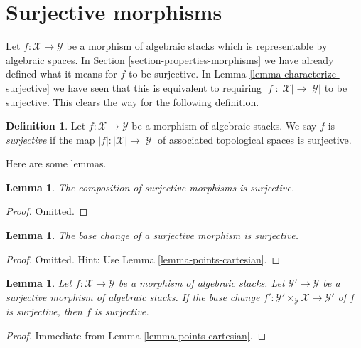 \documentclass{stacks-project}
\theoremstyle{plain}
\newtheorem{lemma}[subsection]{Lemma}
\theoremstyle{definition}
\newtheorem{definition}[subsection]{Definition}
\theoremstyle{remark}
\numberwithin{equation}{subsection}
\begin{document}
\section{Surjective morphisms}
\label{section-surjective}

\noindent
Let $f : \mathcal{X} \to \mathcal{Y}$ be a morphism of algebraic stacks
which is representable by algebraic spaces. In
Section \ref{section-properties-morphisms}
we have already defined what it means for $f$ to be surjective. In
Lemma \ref{lemma-characterize-surjective}
we have seen that this is equivalent to requiring
$|f| : |\mathcal{X}| \to |\mathcal{Y}|$ to be surjective.
This clears the way for the following definition.

\begin{definition}
\label{definition-surjective}
Let $f : \mathcal{X} \to \mathcal{Y}$ be a morphism of algebraic stacks.
We say $f$ is {\it surjective} if the map
$|f| : |\mathcal{X}| \to |\mathcal{Y}|$ of associated topological spaces
is surjective.
\end{definition}

\noindent
Here are some lemmas.

\begin{lemma}
\label{lemma-composition-surjective}
The composition of surjective morphisms is surjective.
\end{lemma}

\begin{proof}
Omitted.
\end{proof}

\begin{lemma}
\label{lemma-base-change-surjective}
The base change of a surjective morphism is surjective.
\end{lemma}

\begin{proof}
Omitted. Hint: Use
Lemma \ref{lemma-points-cartesian}.
\end{proof}

\begin{lemma}
\label{lemma-descent-surjective}
Let $f : \mathcal{X} \to \mathcal{Y}$ be a morphism of algebraic stacks.
Let $\mathcal{Y}' \to \mathcal{Y}$ be a surjective morphism of algebraic
stacks. If the base change $f' : \mathcal{Y}' \times_\mathcal{Y} \mathcal{X}
\to \mathcal{Y}'$ of $f$ is surjective, then $f$ is surjective.
\end{lemma}

\begin{proof}
Immediate from
Lemma \ref{lemma-points-cartesian}.
\end{proof}
\end{document}
